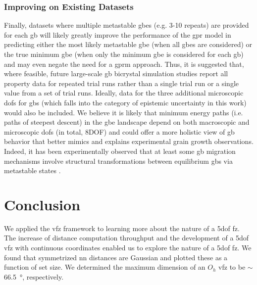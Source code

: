 \documentclass[final,twocolumn,12pt]{elsarticle}
\begin{document}
	\subsubsection{Improving on Existing Datasets} \label{sec:discuss:lit:improve}
	Finally, datasets where multiple metastable \glspl{gbe} (e.g. 3-10 repeats) are provided for each \gls{gb} will likely greatly improve the performance of the \gls{gpr} model in predicting either the most likely metastable \gls{gbe} (when all \glspl{gbe} are considered) or the true minimum \gls{gbe} (when only the minimum \gls{gbe} is considered for each \gls{gb}) and may even negate the need for a \gls{gprm} approach. Thus, it is suggested that, where feasible, future large-scale \gls{gb} bicrystal simulation studies report all property data for repeated trial runs rather than a single trial run or a single value from a set of trial runs. Ideally, data for the three additional microscopic \glspl{dof} for \glspl{gb} (which falls into the category of epistemic uncertainty in this work) would also be included. We believe it is likely that minimum energy paths (i.e. paths of steepest descent) in the \gls{gbe} landscape depend on both macroscopic and microscopic \glspl{dof} (in total, 8DOF) and could offer a more holistic view of \gls{gb} behavior that better mimics and explains experimental grain growth observations. Indeed, it has been experimentally observed that at least some \gls{gb} migration mechanisms involve structural transformations between equilibrium \glspl{gb} via metastable states \cite{weiDirectImagingAtomistic2021}.
	 
	\section{Conclusion} \label{sec:conclusion}
	We applied the \gls{vfz} framework to learning more about the nature of a \gls{5dof} \gls{fz}.
	The increase of distance computation throughput and the development of a \gls{5dof} \gls{vfz} with continuous coordinates enabled us to explore the nature of a \gls{5dof} \gls{fz}. We found that symmetrized \gls{nn} distances are Gaussian and plotted these as a function of set size. We determined the maximum dimension of an $O_h$ \gls{vfz} to be $\sim$\SI{66.5}{\degree}, respectively.
	
\end{document}
